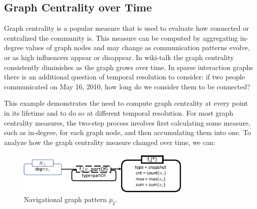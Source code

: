 \subsection{ Graph Centrality over Time} 

Graph centrality is a popular measure that is used to evaluate how
connected or centralized the community is.  This measure can be
computed by aggregating in-degree values of graph nodes and may change
as communication patterns evolve, or as high influencers appear or
disappear.  In wiki-talk the graph centrality consistently diminishes
as the graph grows over time.  In sparse interaction graphs there is
an additional question of temporal resolution to consider: if two
people communicated on May 16, 2010, how long do we consider them to
be connected?

This example demonstrates the need to compute graph centrality at
every point in its lifetime and to do so at different temporal
resolution.  For most graph centrality measures, the two-step process
involves first calculating some measure, such as in-degree, for each
graph node, and then accumulating them into one.  
To analyze how the graph centrality measure changed over time, we can:

\begin{figure}
\centering
\includegraphics[width=3.3in]{figs/snapshotncr.pdf}
\vspace{-0.4cm}
\caption{Navigational graph pattern $p_2$.}
\label{fig:snapshotncr}
\vspace{-0.2cm}
\end{figure}

